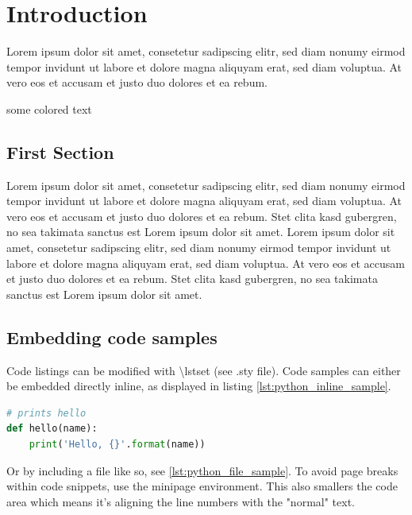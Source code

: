 \chapter{Introduction}
Lorem ipsum dolor sit amet, consetetur sadipscing elitr, sed diam nonumy eirmod tempor invidunt ut labore et dolore magna aliquyam erat, sed diam voluptua. At vero eos et accusam et justo duo dolores et ea rebum. \cite{Abedon2003}

{\color{red}some colored text}

\section{First Section}
Lorem ipsum dolor sit amet, consetetur sadipscing elitr, sed diam nonumy eirmod tempor invidunt ut labore et dolore magna aliquyam erat, sed diam voluptua. At vero eos et accusam et justo duo dolores et ea rebum. Stet clita kasd gubergren, no sea takimata sanctus est Lorem ipsum dolor sit amet. Lorem ipsum dolor sit amet, consetetur sadipscing elitr, sed diam nonumy eirmod tempor invidunt ut labore et dolore magna aliquyam erat, sed diam voluptua. At vero eos et accusam et justo duo dolores et ea rebum. Stet clita kasd gubergren, no sea takimata sanctus est Lorem ipsum dolor sit amet. \cite{Goossens1993}

\section{Embedding code samples}
Code listings can be modified with \textbackslash lstset (see .sty file). Code samples can either be embedded directly inline, as displayed in listing \ref{lst:python_inline_sample}.

\begin{lstlisting}[caption={Python hello function.},captionpos=b,language=python,label=lst:python_inline_sample]
# prints hello
def hello(name):
    print('Hello, {}'.format(name))
\end{lstlisting}
%
Or by including a file like so, see \ref{lst:python_file_sample}. To avoid page breaks within code snippets, use the minipage environment. This also smallers the code area which means it's aligning the line numbers with the "normal" text.




